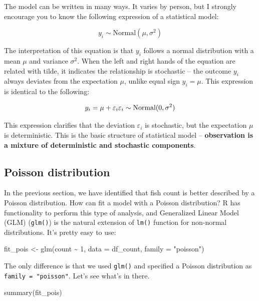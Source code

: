 \documentclass[
]{book}
\newenvironment{Shaded}{\begin{snugshade}}{\end{snugshade}}
\newcommand{\AttributeTok}[1]{\textcolor[rgb]{0.77,0.63,0.00}{#1}}
\newcommand{\DecValTok}[1]{\textcolor[rgb]{0.00,0.00,0.81}{#1}}
\newcommand{\FunctionTok}[1]{\textcolor[rgb]{0.00,0.00,0.00}{#1}}
\newcommand{\NormalTok}[1]{#1}
\newcommand{\OtherTok}[1]{\textcolor[rgb]{0.56,0.35,0.01}{#1}}
\newcommand{\SpecialCharTok}[1]{\textcolor[rgb]{0.00,0.00,0.00}{#1}}
\newcommand{\StringTok}[1]{\textcolor[rgb]{0.31,0.60,0.02}{#1}}
\begin{document}
The model can be written in many ways. It varies by person, but I strongly encourage you to know the following expression of a statistical model:

\[
y_i \sim \text{Normal}(\mu, \sigma^2)
\]

The interpretation of this equation is that \(y_i\) follows a normal distribution with a mean \(\mu\) and variance \(\sigma^2\). When the left and right hands of the equation are related with tilde, it indicates the relationship is stochastic -- the outcome \(y_i\) always deviates from the expectation \(\mu\), unlike equal sign \(y_i = \mu\). This expression is identical to the following:

\[
y_i = \mu + \varepsilon_i\\
\varepsilon_i \sim \text{Normal}(0, \sigma^2)
\]

This expression clarifies that the deviation \(\varepsilon_i\) is stochastic, but the expectation \(\mu\) is deterministic. This is the basic structure of statistical model -- \textbf{observation is a mixture of deterministic and stochastic components}.

\hypertarget{poisson-distribution}{%
\subsection{Poisson distribution}\label{poisson-distribution}}

In the previous section, we have identified that fish count is better described by a Poisson distribution. How can fit a model with a Poisson distribution? R has functionality to perform this type of analysis, and Generalized Linear Model (GLM) (\texttt{glm()}) is the natural extension of \texttt{lm()} function for non-normal distributions. It's pretty easy to use:

\begin{Shaded}
\begin{Highlighting}[]
\NormalTok{fit\_pois }\OtherTok{\textless{}{-}} \FunctionTok{glm}\NormalTok{(count }\SpecialCharTok{\textasciitilde{}} \DecValTok{1}\NormalTok{, }\AttributeTok{data =}\NormalTok{ df\_count, }\AttributeTok{family =} \StringTok{"poisson"}\NormalTok{)}
\end{Highlighting}
\end{Shaded}

The only difference is that we used \texttt{glm()} and specified a Poisson distribution as \texttt{family\ =\ "poisson"}. Let's see what's in there.

\begin{Shaded}
\begin{Highlighting}[]
\FunctionTok{summary}\NormalTok{(fit\_pois)}
\end{Highlighting}
\end{Shaded}
\end{document}
